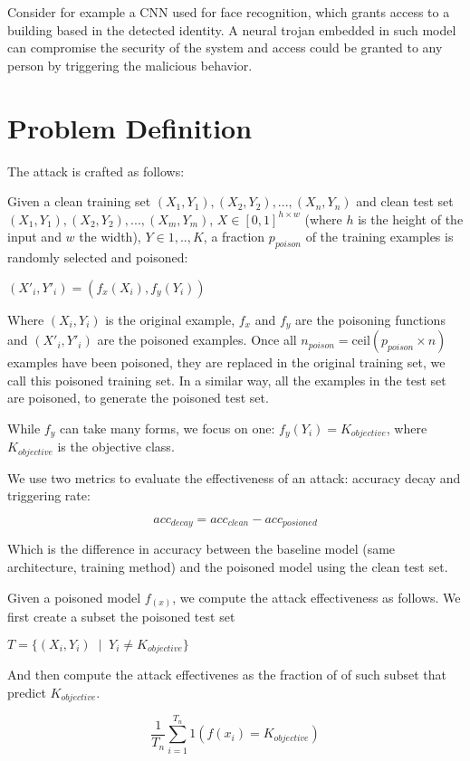 \documentclass[letterpaper, 10 pt, conference]{ieeeconf}  %
\begin{document}
Consider for example a CNN used for face recognition, which grants access to a building based in the detected identity. A neural trojan embedded in such model can compromise the security of the system and access could be granted to any person by triggering the malicious behavior.


\section{Problem Definition}

The attack is crafted as follows:

Given a clean training set $(X_1, Y_1), (X_2, Y_2),..., (X_n, Y_n)$ and clean test set $(X_1, Y_1), (X_2, Y_2),..., (X_m, Y_m)$, $X \in [0, 1]^{h \times w}$ (where $h$ is the height of the input and $w$ the width), $Y \in 1,..,K$, a fraction $p_{poison}$ of the training examples is randomly selected and poisoned:

$(X'_i, Y'_i) = (f_x(X_i), f_y(Y_i))$

Where $(X_i, Y_i)$ is the original example, $f_x$ and $f_y$ are the poisoning functions and $(X'_i, Y'_i)$ are the poisoned examples. Once all $n_{poison} = \text{ceil}(p_{poison} \times n)$examples have been poisoned, they are replaced in the original training set, we call this poisoned training set. In a similar way, all the examples in the test set are poisoned, to generate the poisoned test set.

While $f_y$ can take many forms, we focus on one: $f_y(Y_i) = K_{objective}$, where $K_{objective}$ is the objective class.

We use two metrics to evaluate the effectiveness of an attack: accuracy decay and triggering rate:

$$acc_{decay} = acc_{clean} - acc_{posioned}$$

Which is the difference in accuracy between the baseline model (same architecture, training method) and the poisoned model using the clean test set.

Given a poisoned model $f_(x)$, we compute the attack effectiveness as follows. We first create a subset the poisoned test set 

$T = \{(X_i, Y_i) \;\;|\;\;Y_i  \neq K_{objective}\}$

And then compute the attack effectivenes as the fraction of of such subset that predict $K_{objective}$.

$$\frac{1}{T_n} \sum_{i=1}^{T_n} 1(f(x_i) = K_{objective})$$
\end{document}
